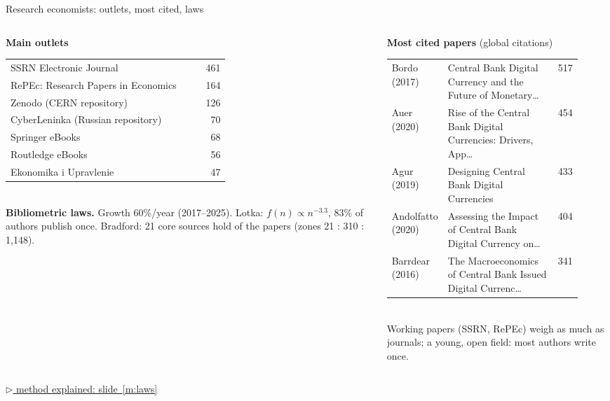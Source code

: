 \documentclass[aspectratio=169,10pt]{beamer}
\newcommand{\method}[1]{\hfill\hyperref[#1]{\tiny\textcolor{c4}{$\triangleright$ method explained: slide~\ref*{#1}}}}
\begin{document}
\begin{frame}{Research economists: outlets, most cited, laws}
\begin{columns}[T]
\begin{column}{0.4\textwidth}\scriptsize\textbf{Main outlets}\\[2pt]
\begin{tabular}{@{}p{0.8\linewidth}r@{}}SSRN Electronic Journal & 461 \\
RePEc: Research Papers in Economics & 164 \\
Zenodo (CERN repository) & 126 \\
CyberLeninka (Russian repository) & 70 \\
Springer eBooks & 68 \\
Routledge eBooks & 56 \\
Ekonomika i Upravlenie & 47 \\\end{tabular}\\[4pt]
\textbf{Bibliometric laws.} Growth 60\%/year (2017--2025). Lotka: $f(n) \propto n^{-3.3}$, 83\% of authors publish once. Bradford: 21 core sources hold  of the papers (zones 21 : 310 : 1,148).
\end{column}
\begin{column}{0.58\textwidth}\scriptsize\textbf{Most cited papers} (global citations)\\[2pt]
\begin{tabular}{@{}p{0.2\linewidth}p{0.66\linewidth}r@{}}
Bordo (2017) & Central Bank Digital Currency and the Future of Monetary\dots{} & 517 \\
Auer (2020) & Rise of the Central Bank Digital Currencies: Drivers, App\dots{} & 454 \\
Agur (2019) & Designing Central Bank Digital Currencies & 433 \\
Andolfatto (2020) & Assessing the Impact of Central Bank Digital Currency on\dots{} & 404 \\
Barrdear (2016) & The Macroeconomics of Central Bank Issued Digital Currenc\dots{} & 341 \\
\end{tabular}\\[6pt]
\small Working papers (SSRN, RePEc) weigh as much as journals; a young, open field: most authors write once.
\end{column}
\end{columns}
\method{m:laws}
\end{frame}
\end{document}
